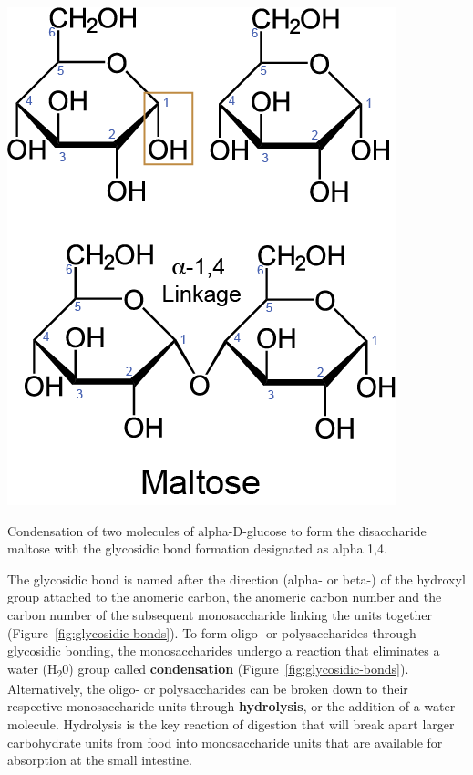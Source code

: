 \documentclass{tufte-handout}
\begin{document}
\begin{marginfigure}
\includegraphics{figures/glycosidic-bonds.png}
\caption{Condensation of two molecules of alpha-D-glucose to form the disaccharide maltose with the glycosidic bond formation designated as alpha 1,4.}\label{fig:glycosidic-bonds}
\end{marginfigure}


 The glycosidic bond is named after the direction (alpha- or beta-) of the hydroxyl group attached to the anomeric carbon, the anomeric carbon number and the carbon number of the subsequent monosaccharide linking the units together (Figure~\ref{fig:glycosidic-bonds}). To form oligo- or polysaccharides through glycosidic bonding, the monosaccharides undergo a reaction that eliminates a water (H\textsubscript{2}0) group called \textbf{condensation} (Figure~\ref{fig:glycosidic-bonds}). Alternatively, the oligo- or polysaccharides can be broken down to their respective monosaccharide units through \textbf{hydrolysis}, or the addition of a water molecule. Hydrolysis is the key reaction of digestion that will break apart larger carbohydrate units from food into monosaccharide units that are available for absorption at the small intestine.
\end{document}
